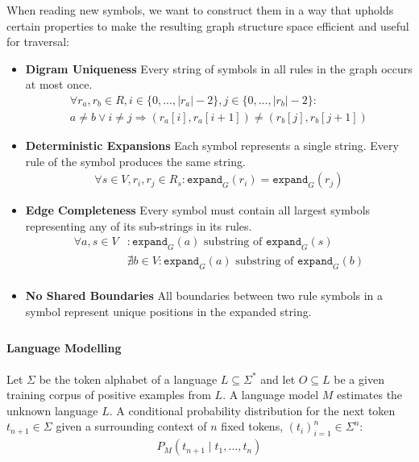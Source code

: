 When reading new symbols, we want to construct them in a way that upholds certain properties to make the resulting graph structure space efficient and useful for traversal:
\begin{itemize}
    \item \textbf{Digram Uniqueness} Every string of symbols in all rules in the graph occurs at most once.
    \begin{gather*}
        \forall r_a, r_b \in R, i \in \{ 0, ..., |r_a| - 2 \}, j \in \{ 0, ..., |r_b| - 2 \}:\\
        a \neq b \lor i \neq j \Longrightarrow (r_a[i], r_a[i + 1]) \neq (r_b[j], r_b[j + 1])
    \end{gather*}

    \item \textbf{Deterministic Expansions} Each symbol represents a single string. Every rule of the symbol produces the same string.
    \begin{align*}
        \forall s \in V, r_i, r_j \in R_s: \texttt{expand}_G(r_i) = \texttt{expand}_G(r_j)
    \end{align*}

    \item \textbf{Edge Completeness} Every symbol must contain all largest symbols representing any of its sub-strings in its rules.
    \begin{align*}
        \forall a, s \in V&: \texttt{expand}_G(a) \text{ substring of } \texttt{expand}_G(s) \\
        &\nexists b \in V: \texttt{expand}_G(a) \text{ substring of } \texttt{expand}_G(b) \\
    \end{align*}

    \item \textbf{No Shared Boundaries} All boundaries between two rule symbols in a symbol represent unique positions in the expanded string.
    \begin{gather*}
    \end{gather*}
\end{itemize}
\paragraph*{Language Modelling}
Let $\Sigma$ be the token alphabet of a language $L \subseteq \Sigma^*$ and let $O \subseteq L$ be a given training corpus of positive examples from $L$.
A language model $M$ estimates the unknown language $L$.
A conditional probability distribution for the next token $t_{n+1} \in \Sigma$ given a surrounding context of $n$ fixed tokens, $(t_i)_{i = 1}^n \in \Sigma^n$:
\begin{align*}
    P_M(t_{n+1} \mid t_1, \ldots, t_n)
\end{align*}

